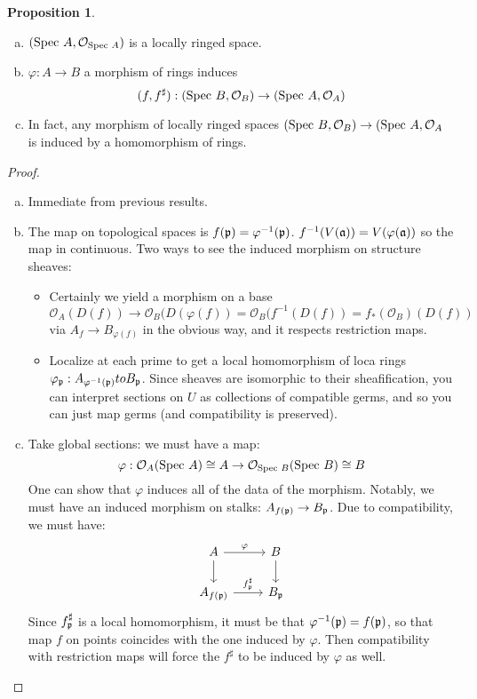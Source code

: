 \documentclass[10pt,reqno]{amsart}
\theoremstyle{definition}
\newtheorem{proposition}[theorem]{Proposition}
\theoremstyle{remark}
\numberwithin{equation}{section}
\numberwithin{theorem}{section}
\newcommand{\OO}{{\mathcal O}}
\newcommand{\spec}{\textup{Spec }}
\newcommand{\fraka}{\frak{a}}
\newcommand{\pp}{\frak{p}}
\begin{document}
\begin{proposition}\text{ }
\begin{enumerate}[(a)]
\item $(\spec A, \OO_{\spec A})$ is a locally ringed space.
\item $\varphi: A \to B$ a morphism of rings induces
\[(f,f^{\sharp}) : (\spec B, \OO_B) \to (\spec A, \OO_A)\]
\item In fact, any morphism of locally ringed spaces $(\spec B, \OO_B) \to (\spec A, \OO_A$ is induced by a homomorphism of rings.
\end{enumerate}
\end{proposition}
\begin{proof}\text{ }
\begin{enumerate}[(a)]
\item Immediate from previous results.
\item The map on topological spaces is $f(\pp) = \varphi^{-1}(\pp)$. $f^{-1}(V(\fraka)) = V(\varphi(\fraka))$ so the map in continuous. Two ways to see the induced morphism on structure sheaves:
\begin{itemize}
\item  Certainly we yield a morphism on a base 
\[\OO_A(D(f)) \to \OO_B(D(\varphi(f)) = \OO_B(f^{-1}(D(f)) = f_*(\OO_B)(D(f))\]
via $A_f \to B_{\varphi(f)}$ in the obvious way, and it respects restriction maps.
\item Localize at each prime to get a local homomorphism of loca rings $\varphi_{\pp}: A_{\varphi^{-1}(\pp)} to B_{\pp}$. Since sheaves are isomorphic to their sheafification, you can interpret sections on $U$ as collections of compatible germs, and so you can just map germs (and compatibility is preserved).
\end{itemize}
\item Take global sections: we must have a map:
\[\varphi: \OO_A(\spec A) \cong A \to \OO_{\spec B}(\spec B) \cong B\]
One can show that $\varphi$ induces all of the data of the morphism. Notably, we must have an induced morphism on stalks: $A_{f(\pp)} \to B_{\pp}$. Due to compatibility, we must have:
\[\begin{tikzcd}
A \arrow[d] \arrow[r,"\varphi"] & B \arrow[d]\\
A_{f(\pp)} \arrow[r, "f^{\sharp}_{\pp}"]& B_{\pp}
\end{tikzcd}\]
Since $f^{\sharp}_{\pp}$ is a local homomorphism, it must be that $\varphi^{-1}(\pp) = f(\pp)$, so that map $f$ on points coincides with the one induced by $\varphi$. Then compatibility with restriction maps will force the $f^{\sharp}$ to be induced by $\varphi$ as well.
\end{enumerate}
\end{proof}
\end{document}
